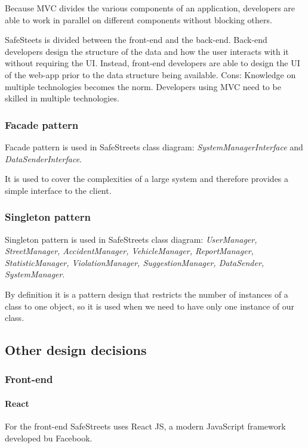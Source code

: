 Because MVC divides the various components of an application, developers are able to work in parallel on different components without blocking others. 

SafeSteets is divided between the front-end and the back-end. Back-end developers design the structure of the data and how the user interacts with it without requiring the UI. Instead, front-end developers are able to design the UI of the web-app prior to the data structure being available.
Cons: Knowledge on multiple technologies becomes the norm. Developers using MVC need to be skilled in multiple technologies.


\subsubsection{Facade pattern}
Facade pattern is used in SafeStreets class diagram: \textit{SystemManagerInterface} and \textit{DataSenderInterface}.

It is used to cover the complexities of a large system and therefore provides a simple interface to the client. 


\subsubsection{Singleton pattern}
Singleton pattern is used in SafeStreets class diagram: \textit{UserManager, StreetManager, AccidentManager, VehicleManager, ReportManager, StatisticManager, ViolationManager, SuggestionManager, DataSender, SystemManager}.

By definition it is a pattern design that restricts the number of instances of a class to one object, so it is used when we need to have only one instance of our class.


\subsection{Other design decisions}

\subsubsection{Front-end}

\paragraph{React}

For the front-end SafeStreets uses React JS, a modern JavaScript framework developed bu Facebook.

